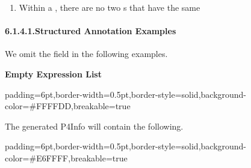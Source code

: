 \documentclass[11pt]{article}
\begin{document}
{\begin{enumerate}
\item{}
Within a , there are no two s that have the
same %
\end{enumerate}%

\paragraph{6.1.4.1.\hspace*{0.5em}Structured Annotation Examples}\label{sec-structured-annotation-examples}%

\noindent{}We omit the  field in the following examples.%

\textbf{Empty Expression List}%

\begin{mdbmargintb}{6pt}{6pt}%
\begin{mdblock}{padding=6pt,border-width=0.5pt,border-style=solid,background-color=\#FFFFDD,breakable=true}%
\begin{mdpre}%
\end{mdpre}%
\end{mdblock}%
\end{mdbmargintb}%

\noindent{}The generated P4Info will contain the following.%

\begin{mdbmargintb}{6pt}{6pt}%
\begin{mdblock}{padding=6pt,border-width=0.5pt,border-style=solid,background-color=\#E6FFFF,breakable=true}%
\begin{mdpre}%
\end{mdpre}%
\end{mdblock}%
\end{mdbmargintb}%

}
\end{document}
